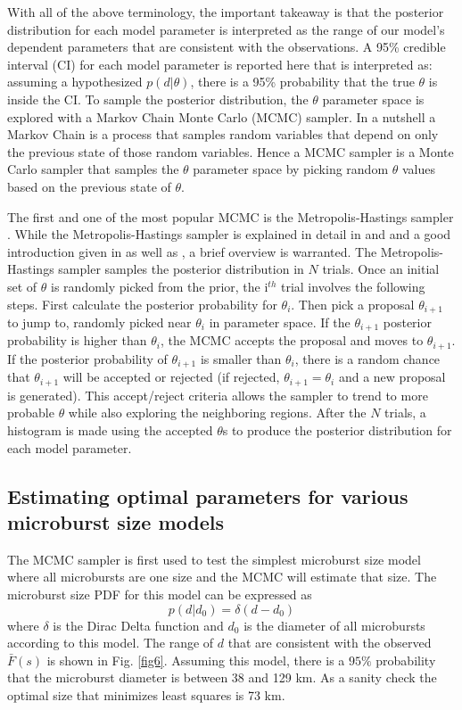 With all of the above terminology, the important takeaway is that the posterior distribution for each model parameter is interpreted as the range of our model's dependent parameters that are consistent with the observations. A 95\% credible interval (CI) for each model parameter is reported here that is interpreted as: assuming a hypothesized $p(d | \theta)$, there is a 95\% probability that the true $\theta$ is inside the CI. To sample the posterior distribution, the $\theta$ parameter space is explored with a Markov Chain Monte Carlo (MCMC) sampler. In a nutshell a Markov Chain is a process that samples random variables that depend on only the previous state of those random variables. Hence a MCMC sampler is a Monte Carlo sampler that samples the $\theta$ parameter space by picking random $\theta$ values based on the previous state of $\theta$. 

The first and one of the most popular MCMC is the Metropolis-Hastings sampler \citep{Metropolis1953, Hastings1970}. While the Metropolis-Hastings sampler is explained in detail in \citet{Metropolis1953} and \citet{Hastings1970} and a good introduction given in \citet{Sambridge2006} as well as \citet{Sharma2017}, a brief overview is warranted. The Metropolis-Hastings sampler samples the posterior distribution in $N$ trials. Once an initial set of $\theta$ is randomly picked from the prior, the i$^{th}$ trial involves the following steps. First calculate the posterior probability for $\theta_i$. Then pick a proposal $\theta_{i+1}$ to jump to, randomly picked near $\theta_i$ in parameter space. If the $\theta_{i+1}$ posterior probability is higher than $\theta_i$, the MCMC accepts the proposal and moves to $\theta_{i+1}$. If the posterior probability of $\theta_{i+1}$ is smaller than $\theta_{i}$, there is a random chance that $\theta_{i+1}$ will be accepted or rejected (if rejected, $\theta_{i+1} = \theta_i$ and a new proposal is generated). This accept/reject criteria allows the sampler to trend to more probable $\theta$ while also exploring the neighboring regions. After the $N$ trials, a histogram is made using the accepted $\theta$s to produce the posterior distribution for each model parameter.


\subsection{Estimating optimal parameters for various microburst size models}
The MCMC sampler is first used to test the simplest microburst size model where all microbursts are one size and the MCMC will estimate that size. The microburst size PDF for this model can be expressed as
\begin{equation}
p(d | d_0) = \delta(d-d_0)
\end{equation} where $\delta$ is the Dirac Delta function and $d_0$ is the diameter of all microbursts according to this model. The range of $d$ that are consistent with the observed $\bar{F}(s)$ is shown in Fig. \ref{fig6}. Assuming this model, there is a $95 \%$ probability that the microburst diameter is between 38 and 129 km. As a sanity check the optimal size that minimizes least squares is 73 km.

